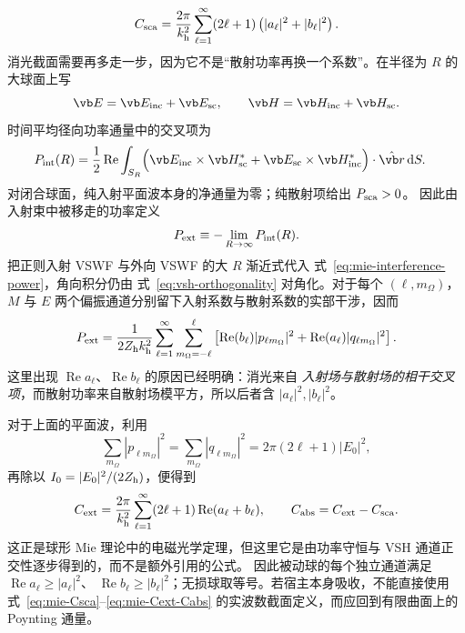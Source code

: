 \begin{equation}
{
C_{\rm sca}
=\frac{2\pi}{k_{\rm h}^2}
\sum_{\ell=1}^{\infty}(2\ell+1)
\left(|a_\ell|^2+|b_\ell|^2\right).}
\label{eq:mie-Csca}
\end{equation}
消光截面需要再多走一步，因为它不是“散射功率再换一个系数”。在半径为 $R$ 的大球面上写
\[
 \vb E=\vb E_{\rm inc}+\vb E_{\rm sc},
 \qquad
 \vb H=\vb H_{\rm inc}+\vb H_{\rm sc}.
\]
时间平均径向功率通量中的交叉项为
\begin{align}
P_{\rm int}(R)
={}&\frac12\operatorname{Re}
\int_{S_R}
\Bigl(
 \vb E_{\rm inc}\times\vb H_{\rm sc}^{*}
 +\vb E_{\rm sc}\times\vb H_{\rm inc}^{*}
\Bigr)\cdot\hat{\vb r}\,\dd S .
\label{eq:mie-interference-power}
\end{align}
对闭合球面，纯入射平面波本身的净通量为零；纯散射项给出 $P_{\rm sca}>0$。
因此由入射束中被移走的功率定义
\begin{equation}
 P_{\rm ext}\equiv-\lim_{R\to\infty}P_{\rm int}(R).
 \label{eq:mie-extinction-power-definition}
\end{equation}
把正则入射 VSWF 与外向 VSWF 的大 $R$ 渐近式代入
式~\cref{eq:mie-interference-power}，角向积分仍由
式~\cref{eq:vsh-orthogonality} 对角化。对于每个
$(\ell,m_{\Omega})$，$M$ 与 $E$ 两个偏振通道分别留下入射系数与散射系数的实部干涉，因而
\begin{equation}
 P_{\rm ext}
 =\frac{1}{2Z_{\rm h}k_{\rm h}^{2}}
 \sum_{\ell=1}^{\infty}\sum_{m_{\Omega}=-\ell}^{\ell}
 \left[
 \operatorname{Re}(b_\ell)|p_{\ell m_{\Omega}}|^2
 +\operatorname{Re}(a_\ell)|q_{\ell m_{\Omega}}|^2
 \right].
 \label{eq:mie-arbitrary-beam-extinction-power}
\end{equation}
这里出现 $\operatorname{Re}a_\ell$、$\operatorname{Re}b_\ell$ 的原因已经明确：消光来自
\emph{入射场与散射场的相干交叉项}，而散射功率来自散射场模平方，所以后者含
$|a_\ell|^2,|b_\ell|^2$。

对于上面的平面波，利用
\[
 \sum_{m_{\Omega}}|p_{\ell m_{\Omega}}|^2
 =\sum_{m_{\Omega}}|q_{\ell m_{\Omega}}|^2
 =2\pi(2\ell+1)|E_0|^2,
\]
再除以 $I_0=|E_0|^2/(2Z_{\rm h})$，便得到
\begin{equation}
{
C_{\rm ext}
=\frac{2\pi}{k_{\rm h}^2}
\sum_{\ell=1}^{\infty}(2\ell+1)
\operatorname{Re}(a_\ell+b_\ell),
\qquad
C_{\rm abs}=C_{\rm ext}-C_{\rm sca}.}
\label{eq:mie-Cext-Cabs}
\end{equation}
这正是球形 Mie 理论中的电磁光学定理，但这里它是由功率守恒与 VSH 通道正交性逐步得到的，而不是额外引用的公式。
因此被动球的每个独立通道满足
$\operatorname{Re}a_\ell\ge|a_\ell|^2$、
$\operatorname{Re}b_\ell\ge|b_\ell|^2$；无损球取等号。若宿主本身吸收，不能直接使用式~\cref{eq:mie-Csca}--\cref{eq:mie-Cext-Cabs} 的实波数截面定义，而应回到有限曲面上的 Poynting 通量。

